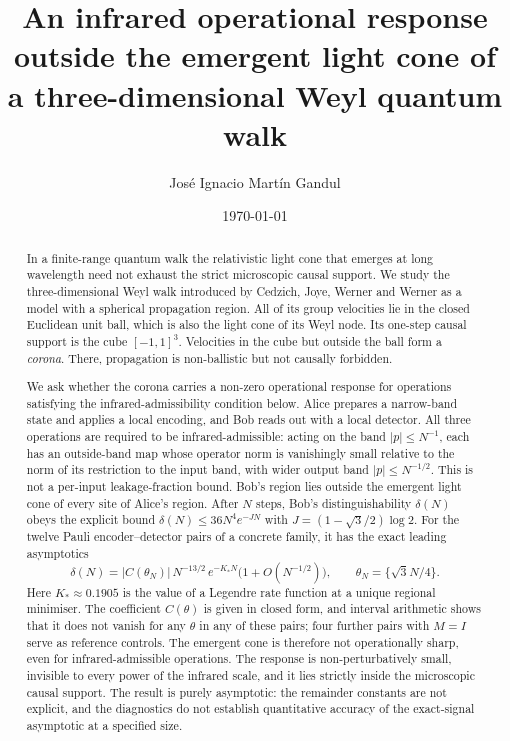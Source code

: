\documentclass[11pt]{amsart}
\theoremstyle{definition}
\theoremstyle{remark}
\begin{document}
\title[Infrared response outside the emergent light cone]{An infrared operational response outside the emergent light cone of a three-dimensional Weyl quantum walk}

\author{Jos\'e Ignacio Mart\'in Gandul}
\address{Independent Researcher, Seville, Spain}

\date{\today}

\begin{abstract}
In a finite-range quantum walk the relativistic light cone that emerges at
long wavelength need not exhaust the strict microscopic causal support.  We
study the three-dimensional Weyl walk introduced by Cedzich, Joye, Werner and
Werner as a model with a spherical propagation region.  All of its group
velocities lie in the closed Euclidean unit ball, which is also the light
cone of its Weyl node.  Its one-step causal support is the cube $[-1,1]^3$.
Velocities in the cube but outside the ball form a \emph{corona}.  There,
propagation is non-ballistic but not causally forbidden.

We ask whether the corona carries a non-zero operational response for
operations satisfying the infrared-admissibility condition below.
Alice prepares a narrow-band state and applies a local
encoding, and Bob reads out with a local detector.  All three operations are
required to be infrared-admissible: acting on the band $|p|\le N^{-1}$, each
has an outside-band map whose operator norm is vanishingly small relative
to the norm of its restriction to the input band, with wider output band
$|p|\le N^{-1/2}$. This is not a per-input leakage-fraction bound. Bob's
region lies outside the emergent light cone of every site of Alice's region.
After $N$ steps, Bob's distinguishability $\delta(N)$ obeys the explicit
bound $\delta(N)\le 36N^4e^{-JN}$ with $J=(1-\sqrt3/2)\log 2$.  For the twelve
Pauli encoder--detector pairs of a concrete family, it has the exact leading
asymptotics
\[
\delta(N)=\bigl|C(\theta_N)\bigr|\,N^{-13/2}\,e^{-K_*N}\bigl(1+O(N^{-1/2})\bigr),
\qquad \theta_N=\{\sqrt3N/4\}.
\]
Here $K_*\approx0.1905$ is the value of a Legendre rate function at a unique
regional minimiser.  The coefficient $C(\theta)$ is given in closed form, and
interval arithmetic shows that it does not vanish for any $\theta$ in any of
these pairs; four further pairs with $M=I$ serve as reference controls.  The emergent cone is therefore not operationally sharp,
even for infrared-admissible operations.  The response is non-perturbatively
small, invisible to every power of the infrared scale, and it lies strictly
inside the microscopic causal support.  The result is purely asymptotic: the
remainder constants are not explicit, and the diagnostics do not establish
quantitative accuracy of the exact-signal asymptotic at a specified size.
\end{abstract}
\end{document}
